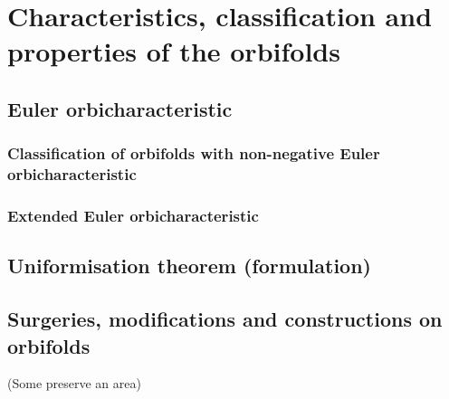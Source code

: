 \chapter{Characteristics, classification and properties of the orbifolds}
\section{Euler orbicharacteristic}
\subsection{Classification of orbifolds with non-negative Euler orbicharacteristic}
\subsection{Extended Euler orbicharacteristic}
\section{Uniformisation theorem (formulation)}
\section{Surgeries, modifications and constructions on orbifolds}
(Some preserve an area)




